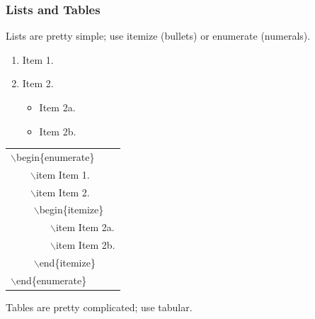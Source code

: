 \documentclass{beamer}  %
\newcommand{\bi}{\bigskip}  %
\begin{document}
\frame
{
\frametitle{Lists and Tables}

Lists are pretty simple; use {\color{red} itemize} (bullets) or {\color{red} enumerate} (numerals).\!\!\!\!\!\!

\bi
\begin{enumerate}
\item Item 1.
\item Item 2.
\begin{itemize}
\item Item 2a.
\item Item 2b.
\end{itemize}
\end{enumerate}
\vspace{-0.8in}\hspace{1.8in}\begin{minipage}{2in}
\begin{tabular}{|l|} \hline
{\color{red} $\backslash$begin\{enumerate\}}\\
~~~~$\backslash$item  Item 1. \\
~~~~$\backslash$item  Item 2. \\
~~~~{\color{red} $\backslash$begin\{itemize\}}\\
~~~~~~~~$\backslash$item  Item 2a. \\
~~~~~~~~$\backslash$item  Item 2b. \\
~~~~{\color{red} $\backslash$end\{itemize\}}\\ 
{\color{red} $\backslash$end\{enumerate\}}\\ \hline
\end{tabular}
\end{minipage}

\bi
Tables are pretty complicated; use {\color{red} tabular}.

\vspace{0.6in}

}
\end{document}
